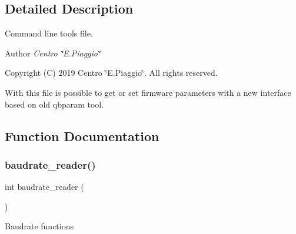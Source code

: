 \subsection{Detailed Description}
Command line tools file. 

\begin{DoxyAuthor}{Author}
{\itshape Centro \char`\"{}\+E.\+Piaggio\char`\"{}} 
\end{DoxyAuthor}
\begin{DoxyCopyright}{Copyright}
(C) 2019 Centro \char`\"{}\+E.\+Piaggio\char`\"{}. All rights reserved.
\end{DoxyCopyright}
With this file is possible to get or set firmware parameters with a new interface based on old qbparam tool. 

\subsection{Function Documentation}
\mbox{\label{nmmi__param_8c_a872d84bb02f7d8f4617246f0c6d37c43}} 
\subsubsection{baudrate\+\_\+reader()}
{\footnotesize\ttfamily int baudrate\+\_\+reader (\begin{DoxyParamCaption}{ }\end{DoxyParamCaption})}

Baudrate functions 